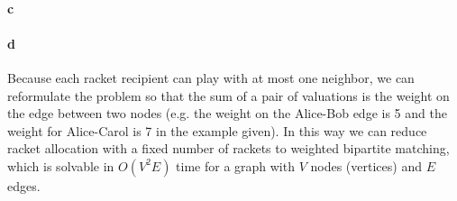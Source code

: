 \begin{answer}{2}
\paragraph{c} 

\paragraph{d}  Because each racket recipient can play with at most one neighbor, we can reformulate the problem so that the sum of a pair of valuations is the weight on the edge between two nodes (e.g. the weight on the Alice-Bob edge is 5 and the weight for Alice-Carol is 7 in the example given). In this way we can reduce racket allocation with a fixed number of rackets to weighted bipartite matching, which is solvable in $O(V^2 E)$ time for a graph with $V$ nodes (vertices) and $E$ edges. 


\end{answer}



